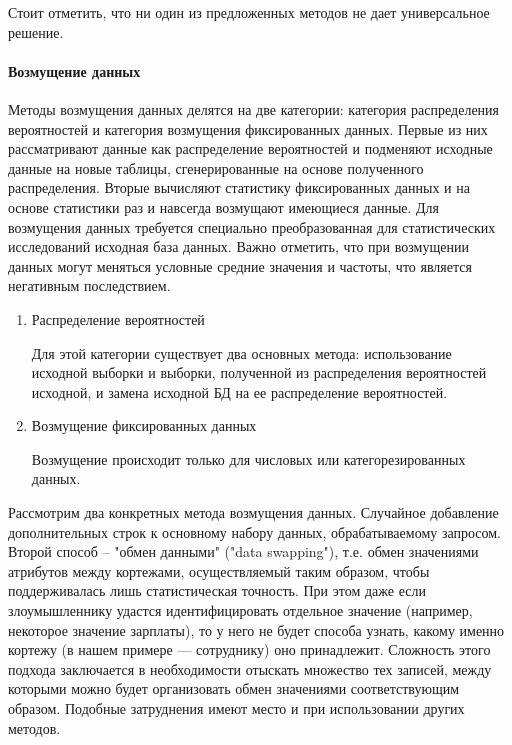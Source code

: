 Стоит отметить, что ни один из предложенных методов не дает универсальное решение.

\paragraph{Возмущение данных}

Методы возмущения данных делятся на две категории: категория распределения вероятностей и категория возмущения фиксированных данных. Первые из них рассматривают данные как распределение вероятностей и подменяют исходные данные на новые таблицы, сгенерированные на основе полученного распределения. Вторые вычисляют статистику фиксированных данных и на основе статистики раз и навсегда возмущают имеющиеся данные. Для возмущения данных требуется специально преобразованная для статистических исследований исходная база данных. Важно отметить, что при возмущении данных могут меняться условные средние значения и частоты, что является негативным последствием.

\begin{enumerate}
  \item Распределение вероятностей

Для этой категории существует два основных метода: использование исходной выборки и выборки, полученной из распределения вероятностей исходной, и замена исходной БД на ее распределение вероятностей.

  \item Возмущение фиксированных данных

Возмущение происходит только для числовых или категорезированных данных.

\end{enumerate}


Рассмотрим два конкретных метода возмущения данных.
Случайное добавление дополнительных строк к основному набору данных, обрабатываемому запросом.
Второй способ -- "обмен данными" ("data swapping"), т.е. обмен значениями атрибутов между кортежами, осуществляемый таким образом, чтобы поддерживалась лишь статистическая точность. При этом даже если злоумышленнику удастся идентифицировать отдельное значение (например, некоторое значение зарплаты), то у него не будет способа узнать, какому именно кортежу (в нашем примере — сотруднику) оно принадлежит. Сложность этого подхода заключается в необходимости отыскать множество тех записей, между которыми можно будет организовать обмен значениями соответствующим образом. Подобные затруднения имеют место и при использовании других методов.

